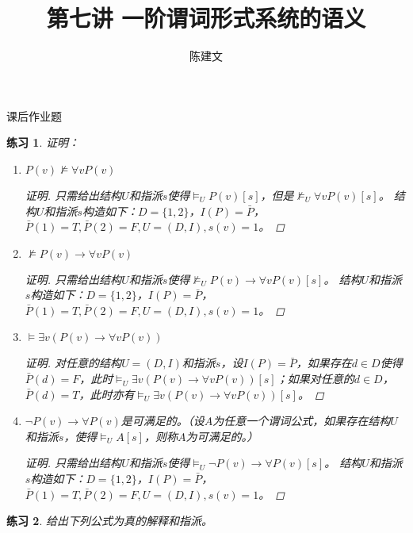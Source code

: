 \documentclass{article}
\newtheorem{Exercise}{练习}
\begin{document}
\begin{CJK*}{UTF8}{gbsn}
  \title{第七讲 一阶谓词形式系统的语义}
  \author{陈建文}
  \maketitle

 
课后作业题
\begin{Exercise}证明：
  \begin{enumerate}
    \item $P(v)\nvDash \forall v P(v)$
    \begin{proof}[证明]
      只需给出结构$U$和指派$s$使得$\vDash_U P(v)[s]$，但是$\nvDash_U\forall vP(v)[s]$。
结构$U$和指派$s$构造如下：$D=\{1,2\}$，$I(P)=\bar{P}$，$\bar{P}(1)=T,\bar{P}(2)=F, U=(D,I), s(v)=1$。
    \end{proof}
    \item $\nvDash P(v)\to \forall vP(v)$
    \begin{proof}[证明]
      只需给出结构$U$和指派$s$使得$\nvDash_UP(v)\to \forall vP(v)[s]$。
结构$U$和指派$s$构造如下：$D=\{1,2\}$，$I(P)=\bar{P}$，$\bar{P}(1)=T,\bar{P}(2)=F, U=(D,I), s(v)=1$。
    \end{proof}
    \item $\vDash \exists v(P(v)\to \forall v P(v))$
    \begin{proof}[证明]
      对任意的结构$U=(D,I)$和指派$s$，设$I(P)=\bar{P}$，如果存在$d\in D$使得$\bar{P}(d)=F$，此时$\vDash_U\exists v(P(v)\to \forall v P(v))[s]$；如果对任意的$d\in D$，$\bar{P}(d)=T$，此时亦有$\vDash_U\exists v(P(v)\to \forall v P(v))[s]$。
    \end{proof}
    \item $\lnot P(v)\to \forall P(v)$是可满足的。（设$A$为任意一个谓词公式，如果存在结构$U$和指派$s$，使得$\vDash_UA[s]$，则称$A$为可满足的。）
    \begin{proof}[证明]
      只需给出结构$U$和指派$s$使得$\vDash_U\lnot P(v)\to \forall P(v)[s]$。
结构$U$和指派$s$构造如下：$D=\{1,2\}$，$I(P)=\bar{P}$，$\bar{P}(1)=T,\bar{P}(2)=F, U=(D,I), s(v)=1$。
    \end{proof}

  \end{enumerate}
\end{Exercise}

\begin{Exercise}
  给出下列公式为真的解释和指派。


\end{Exercise}
\end{CJK*}
\end{document}
